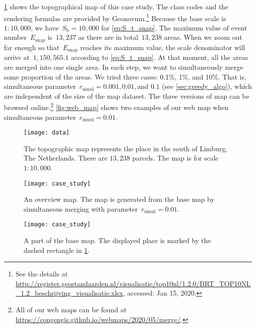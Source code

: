 \documentclass[twocolumn]{svjour3}          %
\begin{document}
%
\figs\ref{fig:data} shows the topographical map of this case study.
The class codes and the rendering formulas are provided by Geonovum.\footnote{%
See the details at
\url{http://register.geostandaarden.nl/visualisatie/top10nl/1.2.0/BRT_TOP10NL_1.2_beschrijving_visualisatie.xlsx},
accessed: Jan 15, 2020.}
%
Because the base scale is $1:10{,}000$, 
we have~$S_\mathrm{b} = 10{,}000$ for \eq\ref{eq:S_t_snap}.
The maximum value of event number~$E_\mathrm{snap}$ is~$13{,}237$
as there are in total~$13{,}238$ areas.
When we zoom out far enough 
so that~$E_\mathrm{snap}$ reaches its maximum value,
the scale denominator will arrive at~$1{,}150{,}565.1$
according to \eq\ref{eq:S_t_snap}.
At that moment, all the areas are merged into one single area.
In each step, we want to simultaneously merge some proportion of the areas.
We tried three cases: 0.1\%, 1\%, and 10\%.
That is, simultaneous parameter~$r_\mathrm{simul}=0.001, 0.01, \text{and~} 0.1$ 
(see \sect\ref{sec:greedy_algo}), 
which are independent of the size of the map dataset.
The three versions of map can be browsed online.\footnote{%
All of our web maps can be found at
\url{https://congengis.github.io/webmaps/2020/05/merge/}.}
\fig\ref{fig:web_map} shows two examples of our web map when 
simultaneous parameter~$r_\mathrm{simul}=0.01$.


\begin{figure}[tb]
\centering
\texttt{[image: data]}
\caption{
    The topographic map represents the place 
    in the south of Limburg, The Netherlands.
    There are $13{,}238$ parcels.
    The map is for scale $1:10{,}000$.}
\label{fig:data}
\end{figure}


\begin{figure*}[tb]
\centering
\begin{subfigure}[t]{\textwidth}
\centering
\texttt{[image: case\_study]}
\caption{An overview map. The map is generated from the base map 
    by simultaneous merging with parameter~$r_\mathrm{simul}= 0.01$.}
\end{subfigure}
\newline
\vspace{0.5cm}
%
\begin{subfigure}[t]{\textwidth}
\centering
\texttt{[image: case\_study]}
\caption{A part of the base map. The displayed place is marked 
    by the dashed rectangle in \fig\ref{fig:data}.}
\end{subfigure}
\caption{Two examples of our web map with different scales.
    }
\label{fig:web_map}
\end{figure*}
\end{document}

